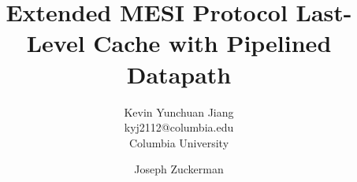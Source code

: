 \documentclass{sig-alternate}
\begin{document}
\title{\Large\bf Extended MESI Protocol Last-Level Cache with Pipelined Datapath}

\author{
\large
Kevin Yunchuan Jiang\\
\large kyj2112@columbia.edu\\
\large Columbia University
\and Joseph Zuckerman\\
}

\vspace{-2cm}

\maketitle

\vspace{-2cm}



\end{document}
